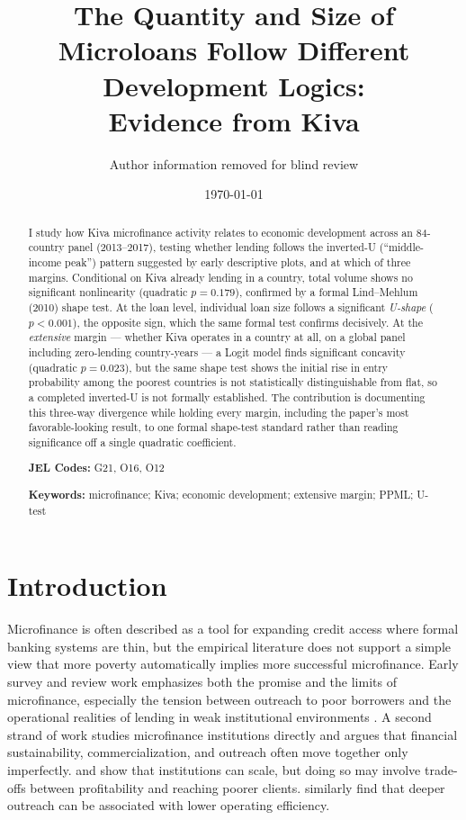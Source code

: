 \documentclass[12pt]{article}
\title{\textbf{The Quantity and Size of Microloans Follow Different Development Logics:\\
Evidence from Kiva}}
\author{Author information removed for blind review}
\date{\today}
\begin{document}
\maketitle

\begin{abstract}
\noindent
I study how Kiva microfinance activity relates to economic development across an 84-country panel
(2013--2017), testing whether lending follows the inverted-U (``middle-income peak'') pattern
suggested by early descriptive plots, and at which of three margins. Conditional on Kiva already
lending in a country, total volume shows no significant nonlinearity (quadratic $p=0.179$), confirmed
by a formal Lind--Mehlum (2010) shape test. At the loan level, individual loan size follows a
significant \emph{U-shape} ($p<0.001$), the opposite sign, which the same formal test confirms
decisively. At the \emph{extensive} margin --- whether Kiva operates in a country at all, on a global
panel including zero-lending country-years --- a Logit model finds significant concavity (quadratic
$p=0.023$), but the same shape test shows the initial rise in entry probability among the poorest
countries is not statistically distinguishable from flat, so a completed inverted-U is not formally
established. The contribution is documenting this three-way divergence while holding every margin,
including the paper's most favorable-looking result, to one formal shape-test standard rather than
reading significance off a single quadratic coefficient.

\vspace{0.5cm}
\noindent \textbf{JEL Codes:} G21, O16, O12

\noindent \textbf{Keywords:} microfinance; Kiva; economic development; extensive margin; PPML;
U-test
\end{abstract}

\doublespacing
{}

\section{Introduction}

Microfinance is often described as a tool for expanding credit access where formal banking systems
are thin, but the empirical literature does not support a simple view that more poverty automatically
implies more successful microfinance. Early survey and review work emphasizes both the promise and
the limits of microfinance, especially the tension between outreach to poor borrowers and the
operational realities of lending in weak institutional environments \citep{morduch1999}. A second
strand of work studies microfinance institutions directly and argues that financial sustainability,
commercialization, and outreach often move together only imperfectly. \citet{cull2007} and
\citet{cull2009} show that institutions can scale, but doing so may involve trade-offs between
profitability and reaching poorer clients. \citet{hermes2011} similarly find that deeper outreach can
be associated with lower operating efficiency.
\end{document}
